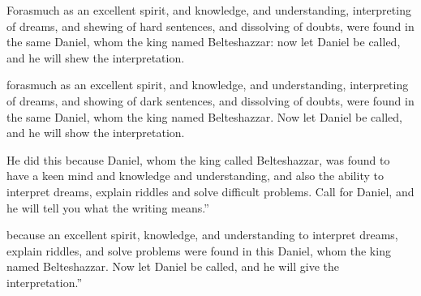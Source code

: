 			Forasmuch as an excellent spirit, and knowledge, and understanding, interpreting of dreams, and shewing of hard sentences, and dissolving of doubts, were found in the same Daniel, whom the king named Belteshazzar: now let Daniel be called, and he will shew the interpretation.

			\begin{versebox}
					\item[BHS] 
					\item[LXX] 
					\item[ASV] forasmuch as an excellent spirit, and knowledge, and understanding, interpreting of dreams, and showing of dark sentences, and dissolving of doubts, were found in the same Daniel, whom the king named Belteshazzar. Now let Daniel be called, and he will show the interpretation.
					\item[NIV] He did this because Daniel, whom the king called Belteshazzar, was found to have a keen mind and knowledge and understanding, and also the ability to interpret dreams, explain riddles and solve difficult problems. Call for Daniel, and he will tell you what the writing means.”
					\item[NRSV] because an excellent spirit, knowledge, and understanding to interpret dreams, explain riddles, and solve problems were found in this Daniel, whom the king named Belteshazzar. Now let Daniel be called, and he will give the interpretation.”
			\end{versebox}

